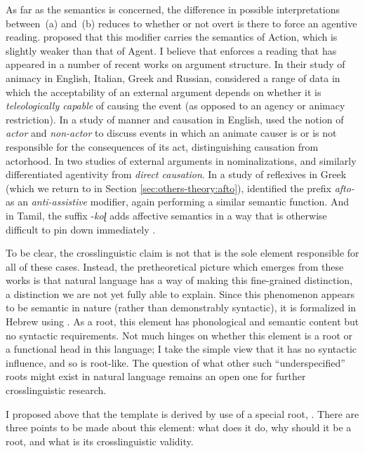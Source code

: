 As far as the semantics is concerned, the difference in possible interpretations between~(\lastx a) and~(\lastx b) reduces to whether or not overt {\va} is there to force an agentive reading. \cite{doron03} proposed that this modifier carries the semantics of Action, which is slightly weaker than that of Agent. I believe that {\va} enforces a reading that has appeared in a number of recent works on argument structure. In their study of animacy in English, Italian, Greek and Russian, \cite{folliharley08} considered a range of data in which the acceptability of an external argument depends on whether it is \emph{teleologically capable} of causing the event (as opposed to an agency or animacy restriction). In a study of manner and causation in English, \cite{beaverskoontzgarboden12} used the notion of \emph{actor} and \emph{non-actor} to discuss events in which an animate causer is or is not responsible for the consequences of its act, distinguishing causation from actorhood. In two studies of external arguments in nominalizations, \cite{sichel10n} and \cite{alexiadouetal13} similarly differentiated agentivity from \emph{direct causation}. In a study of reflexives in Greek (which we return to in Section \ref{sec:others-theory:afto}), \cite{spathasetal15} identified the prefix \emph{afto-} as an \emph{anti-assistive} modifier, again performing a similar semantic function. And in Tamil, the suffix -\emph{koɭ} adds affective semantics in a way that is otherwise difficult to pin down immediately \citep{sundaresanmcfadden17}.

To be clear, the crosslinguistic claim is not that {\va} is the sole element responsible for all of these cases. Instead, the pretheoretical picture which emerges from these works is that natural language has a way of making this fine-grained distinction, a distinction we are not yet fully able to explain. Since this phenomenon appears to be semantic in nature (rather than demonstrably syntactic), it is formalized in Hebrew using {\va}. As a root, this element has phonological and semantic content but no syntactic requirements. Not much hinges on whether this element is a root or a functional head in this language; I take the simple view that it has no syntactic influence, and so is root-like. The question of what other such ``underspecified'' roots might exist in natural language remains an open one for further crosslinguistic research.



I proposed above that the template {\tpie} is derived by use of a special root, \va. There are three points to be made about this element: what does it do, why should it be a root, and what is its crosslinguistic validity.

